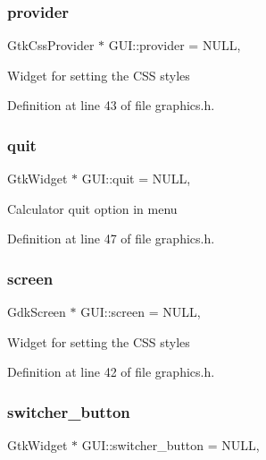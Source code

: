\subsubsection{\texorpdfstring{provider}{provider}}
{\footnotesize\ttfamily Gtk\+Css\+Provider $\ast$ G\+U\+I\+::provider = N\+U\+LL\hspace{0.3cm}{\ttfamily [static]}, {\ttfamily [protected]}}

Widget for setting the C\+SS styles 

Definition at line 43 of file graphics.\+h.

\mbox{\label{class_g_u_i_a9074ece2c54a94cfd0cba3fa1116ca48}} 
\subsubsection{\texorpdfstring{quit}{quit}}
{\footnotesize\ttfamily Gtk\+Widget $\ast$ G\+U\+I\+::quit = N\+U\+LL\hspace{0.3cm}{\ttfamily [static]}, {\ttfamily [protected]}}

Calculator quit option in menu 

Definition at line 47 of file graphics.\+h.

\mbox{\label{class_g_u_i_ac56be6803c5b398fc0ce30fb1fb23e47}} 
\subsubsection{\texorpdfstring{screen}{screen}}
{\footnotesize\ttfamily Gdk\+Screen $\ast$ G\+U\+I\+::screen = N\+U\+LL\hspace{0.3cm}{\ttfamily [static]}, {\ttfamily [protected]}}

Widget for setting the C\+SS styles 

Definition at line 42 of file graphics.\+h.

\mbox{\label{class_g_u_i_a46b07a48ff0779e2a39d7c760849431f}} 
\subsubsection{\texorpdfstring{switcher\_button}{switcher\_button}}
{\footnotesize\ttfamily Gtk\+Widget $\ast$ G\+U\+I\+::switcher\+\_\+button = N\+U\+LL\hspace{0.3cm}{\ttfamily [static]}, {\ttfamily [protected]}}

